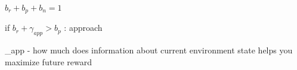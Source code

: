 $b_{r} + b_{p} + b_{n} = 1$

if $b_{r} + \gamma_{app} > b_{p}$ : approach

\gamma_{app} - how much does information about current environment state helps you maximize future reward
